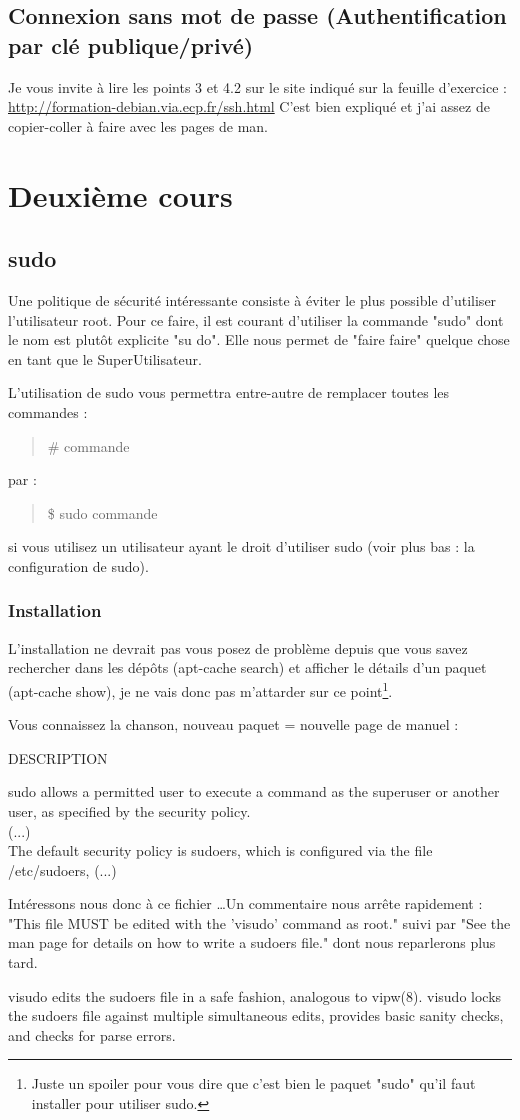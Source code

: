 \documentclass[a4paper]{article}
\newcommand{\commande}[1] {
    \begin{quote}
    \tt\raggedright #1 
    \end{quote}
}
\newcommand{\man}[2]{
    \begin{tcolorbox}[toprule=3mm,width=\textwidth,outer arc=0mm,colbacktitle=grayman,coltitle=black,colback={grayman},colframe={grayman},title={man : \tt #1}]
        \tt\raggedright #2
    \end{tcolorbox}
}
\newcommand{\mandesc}[1]{
    \begin{adjustwidth}{0.8cm}{}
        #1
    \end{adjustwidth}
}
\begin{document}
\subsection{Connexion sans mot de passe (Authentification par clé publique/privé)}
\par Je vous invite à lire les points 3 et 4.2 sur le site indiqué sur la feuille d'exercice : \url{http://formation-debian.via.ecp.fr/ssh.html} C'est bien expliqué et j'ai assez de copier-coller à faire avec les pages de man.

\section{Deuxième cours}
\subsection{sudo}
\par Une politique de sécurité intéressante consiste à éviter le plus possible d'utiliser l'utilisateur root. Pour ce faire, il est courant d'utiliser la commande "sudo" dont le nom est plutôt explicite "su do". Elle nous permet de "faire faire" quelque chose en tant que le SuperUtilisateur.
\par L'utilisation de sudo vous permettra entre-autre de remplacer toutes les commandes :
\commande{\# commande}
par :
\commande{\$ sudo commande}
si vous utilisez un utilisateur ayant le droit d'utiliser sudo (voir plus bas : la configuration de sudo).

\subsubsection{Installation}
\par L'installation ne devrait pas vous posez de problème depuis que vous savez rechercher dans les dépôts (apt-cache search) et afficher le détails d'un paquet (apt-cache show), je ne vais donc pas m'attarder sur ce point\footnote{Juste un spoiler pour vous dire que c'est bien le paquet "sudo" qu'il faut installer pour utiliser sudo.}.
\par Vous connaissez la chanson, nouveau paquet = nouvelle page de manuel :
\man{sudo}{DESCRIPTION
\mandesc{sudo allows a permitted user to execute a command as the superuser or another user, as specified by the security policy.\\
(...)\\
The default security policy is sudoers, which is configured via the file /etc/sudoers, (...)}}
\par Intéressons nous donc à ce fichier \ldots  Un commentaire nous arrête rapidement : "This file MUST be edited with the 'visudo' command as root." suivi par "See the man page for details on how to write a sudoers file." dont nous reparlerons plus tard.
\man{visudo}{visudo edits the sudoers file in a safe fashion, analogous to vipw(8). visudo locks the sudoers file against multiple simultaneous edits, provides basic sanity checks, and checks for parse errors.}
\end{document}
